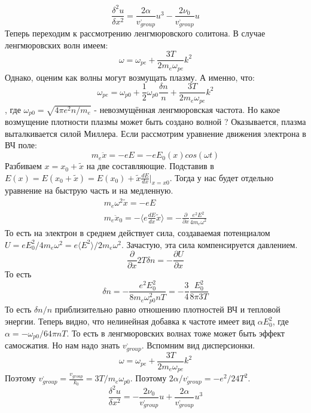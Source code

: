 \documentclass[10pt, a4paper]{article}
\begin{document}
\begin{equation}
	\frac{\delta^2 u}{\delta x^2}=\frac{2 \alpha}{ v^{,}_{group}} u^{3} - \frac{2 \nu_0}{ v^{,}_{group}} u
\end{equation}
Теперь переходим к рассмотрению ленгмюровского солитона. В случае ленгмюровских волн имеем:
\begin{equation}
	\omega=\omega_{pe}+\frac{3T}{2 m_e \omega_{pe}} k^2
\end{equation}
Однако, оценим как волны могут возмущать плазму. А именно, что:
\begin{equation}
	\omega_{pe}=\omega_{p0}+ \frac{1}{2} \omega_{p0} \frac{\delta n}{n}+\frac{3T}{2 m_e \omega_{pe}} k^2
\end{equation}
, где $\omega_{p0}=\sqrt{4 \pi e^2 n/m_e}$ - невозмущённая ленгмюровская частота.
Но какое возмущение плотности плазмы может быть создано волной ?
Оказывается, плазма выталкивается силой Миллера. Если рассмотрим уравнение движения электрона в ВЧ поле:
\begin{equation}
	m_e \ddot x=-eE=-eE_0(x) cos(\omega t)
\end{equation}
Разбиваем $x=x_0 + \tilde x$ на две составляющие. Подставив в $E(x)=E(x_0 + \tilde x)=E(x_0)+ \tilde x \frac{dE}{dx} |_{x=x0}$.
Тогда у нас будет отдельно уравнение на быструю часть и на медленную.
\begin{align*}
	m_e \omega^2 \tilde x = -eE \\
	m_e \ddot x_0= - \langle e\frac{dE}{dx} \tilde x \rangle =- \frac{\partial }{\partial x} \frac{e^2 E^2}{4 m_e  \omega^2}
\end{align*}
То есть на электрон в среднем действует сила, создаваемая потенциалом $U=eE^2_0 /4m_e \omega^2=e \langle E^2 \rangle /2m_e \omega^2$. Зачастую, эта сила компенсируется давлением. 
\begin{equation}
	\frac{\partial}{\partial x} 2T \delta n = - \frac{\partial U}{\partial x}
\end{equation}
То есть
\begin{equation}
	\delta n= - \frac{e^2 E^2_0}{8 m_e  \omega^2_{p0} n T }=- \frac{3}{4} \frac{E^2_0}{8 \pi 3T}
\end{equation}
То есть $\delta n/n$ приблизительно равно отношению плотностей ВЧ и тепловой энергии. Теперь видно, что нелинейная добавка к частоте имеет вид $\alpha E^2_0$, где $\alpha= - \omega_{p0}/64 \pi n T$. То есть в ленгмюровских волнах тоже может быть эффект самосжатия.
Но нам надо знать $v^{,}_{group}$. Вспомним вид дисперсионки.
\begin{equation}
	\omega=\omega_{pe}+\frac{3T}{2 m_e \omega_{pe}} k^2
\end{equation}
Поэтому $v^{,}_{group}=\frac{v_{group}}{k_0}=3T/m_e \omega_{p0}$. Поэтому $2 \alpha / v^{,}_{group} = -e^2/24T^2$.
\begin{equation}
	\frac{\delta^2 u}{\delta x^2}=- \frac{2 \nu_0}{ v^{,}_{group}} u +\frac{2 \alpha}{ v^{,}_{group}} u^{3} 
\end{equation}
\end{document}
